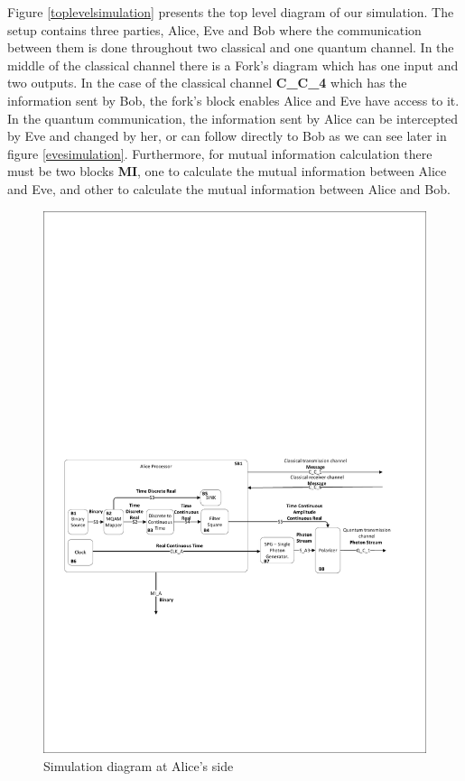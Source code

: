 Figure \ref{toplevelsimulation} presents the top level diagram of our simulation. The setup contains three parties, Alice, Eve and Bob where the communication between them is done throughout two classical and one quantum channel. In the middle of the classical channel there is a Fork's diagram which has one input and two outputs. In the case of the classical channel \textbf{C\_C\_4} which has the information sent by Bob, the fork's block enables Alice and Eve have access to it. In the quantum communication, the information sent by Alice can be intercepted by Eve and changed by her, or can follow directly to Bob as we can see later in figure \ref{evesimulation}. Furthermore, for mutual information calculation there must be two blocks \textbf{MI}, one to calculate the mutual information between Alice and Eve, and other to calculate the mutual information between Alice and Bob.

\begin{figure}[h]
    \centering
        \includegraphics[clip, trim=0.5cm 7cm 0.5cm 10cm, width=1.00\textwidth]{./sdf/bb84_with_discrete_variables/figures_raw/Simulation_Alice_bb84.pdf}
    \caption{Simulation diagram at Alice's side}\label{alicesimulation}
\end{figure}

